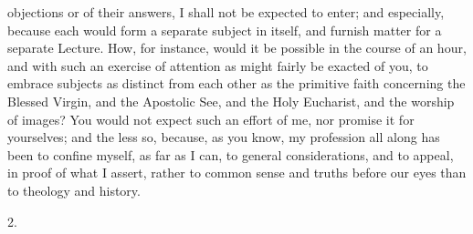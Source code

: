 objections or of their answers, I shall not be expected to enter; and
especially, because each would form a separate subject in itself, and
furnish matter for a separate Lecture. How, for instance, would it be
possible in the course of an hour, and with such an exercise of
attention as might fairly be exacted of you, to embrace subjects as
distinct from each other as the primitive faith concerning the Blessed
Virgin, and the Apostolic See, and the Holy Eucharist, and the worship
of images? You would not expect such an effort of me, nor promise it
for yourselves; and the less so, because, as you know, my profession
all along has been to confine myself, as far as I can, to general
considerations, and to appeal, in proof of what I assert, rather to
common sense and truths before our eyes than to theology and history.

2.

